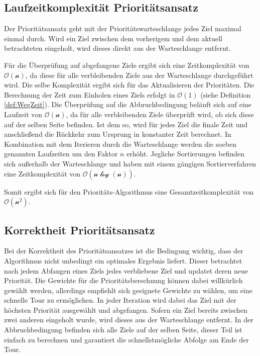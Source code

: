 \documentclass[german,version-2019-11]{uzl-thesis}
\begin{document}
\subsection{Laufzeitkomplexität Prioritätsansatz}

Der Prioritätsansatz geht mit der Prioritätswarteschlange jedes Ziel maximal einmal durch. Wird ein Ziel zwischen dem vorherigem und dem aktuell betrachteten eingeholt, wird dieses direkt aus der Warteschlange entfernt. 

Für die Überprüfung auf abgefangene Ziele ergibt sich eine Zeitkomplexität von $\mathcal{O(n)}$, da diese für alle verbleibenden Ziele aus der Warteschlange durchgeführt wird. Die selbe Komplexität ergibt sich für das Aktualisieren der Prioritäten. Die Berechnung der Zeit zum Einholen eines Ziels erfolgt in $\mathcal{O(1)}$ (siehe Definition \ref{def:WegZeit}). Die Überprüfung auf die Abbruchbedingung beläuft sich auf eine Laufzeit von $\mathcal{O(n)}$, da für alle verbleibenden Ziele überprüft wird, ob sich diese auf der selben Seite befinden. Ist dem so, wird für jedes Ziel die finale Zeit und anschließend die Rückkehr zum Ursprung in konstanter Zeit berechnet. In Kombination mit dem Iterieren durch die Warteschlange werden die soeben genannten Laufzeiten um den Faktor $n$ erhöht. Jegliche Sortierungen befinden sich außerhalb der Warteschlange und haben mit einem gängigen Sortierverfahren \cite{kaaser2014algorithmen} eine Zeitkomplexität von $\mathcal{O(n\log(n))}$. 

Somit ergibt sich für den Prioritäts-Algorithmus eine Gesamtzeitkomplexität von $\mathcal{O(n^2)}$.

\subsection{Korrektheit Prioritätsansatz}
Bei der Korrektheit des Prioritätsansatzes ist die Bedingung wichtig, dass der Algorithmus nicht unbedingt ein optimales Ergebnis liefert. Dieser betrachtet nach jedem Abfangen eines Ziels jedes verbliebene Ziel und updatet deren neue Priorität. Die Gewichte für die Prioritätsberechnung können dabei willkürlich gewählt werden, allerdings empfiehlt sich geeignete Gewichte zu wählen, um eine schnelle Tour zu ermöglichen. In jeder Iteration wird dabei das Ziel mit der höchsten Priorität ausgewählt und abgefangen. Sofern ein Ziel bereits zwischen zwei anderen eingeholt wurde, wird dieses aus der Warteschlange entfernt. In der Abbruchbedingung befinden sich alle Ziele auf der selben Seite, dieser Teil ist einfach zu berechnen und garantiert die schnellstmögliche Abfolge am Ende der Tour. 
\end{document}
